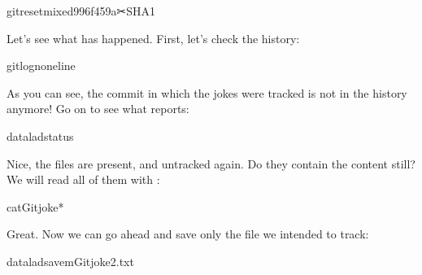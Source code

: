 \begin{sphinxVerbatim}[commandchars=\\\{\}]
gitreset\PYGZhy{}\PYGZhy{}mixed996f459a✂SHA1
\end{sphinxVerbatim}

\sphinxAtStartPar
Let’s see what has happened. First, let’s check the history:

\begin{sphinxVerbatim}[commandchars=\\\{\}]
gitlog\PYGZhy{}n\PYGZhy{}\PYGZhy{}oneline
\end{sphinxVerbatim}

\sphinxAtStartPar
As you can see, the commit in which the jokes were tracked
is not in the history anymore! Go on to see what 
reports:

\begin{sphinxVerbatim}[commandchars=\\\{\}]
dataladstatus
\end{sphinxVerbatim}

\sphinxAtStartPar
Nice, the files are present, and untracked again. Do they contain
the content still? We will read all of them with :

\begin{sphinxVerbatim}[commandchars=\\\{\}]
catGitjoke*
\end{sphinxVerbatim}

\sphinxAtStartPar
Great. Now we can go ahead and save only the file we intended
to track:

\begin{sphinxVerbatim}[commandchars=\\\{\}]
dataladsave\PYGZhy{}mGitjoke2.txt
\end{sphinxVerbatim}

